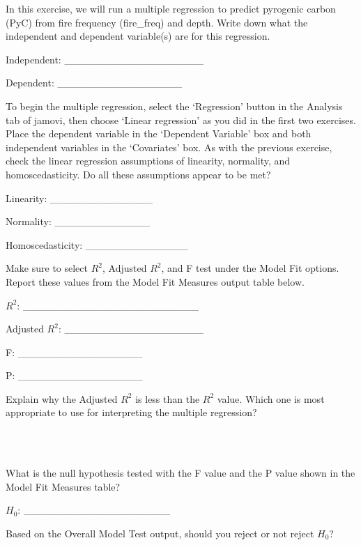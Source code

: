 \documentclass[
  openany]{scrbook}
\begin{document}
In this exercise, we will run a multiple regression to predict pyrogenic carbon (PyC) from fire frequency (fire\_freq) and depth.
Write down what the independent and dependent variable(s) are for this regression.

Independent: \_\_\_\_\_\_\_\_\_\_\_\_\_\_\_\_\_\_\_

Dependent: \_\_\_\_\_\_\_\_\_\_\_\_\_\_\_\_\_

To begin the multiple regression, select the `Regression' button in the Analysis tab of jamovi, then choose `Linear regression' as you did in the first two exercises.
Place the dependent variable in the `Dependent Variable' box and both independent variables in the `Covariates' box.
As with the previous exercise, check the linear regression assumptions of linearity, normality, and homoscedasticity.
Do all these assumptions appear to be met?

Linearity: \_\_\_\_\_\_\_\_\_\_\_\_\_\_

Normality: \_\_\_\_\_\_\_\_\_\_\_\_\_

Homoscedasticity: \_\_\_\_\_\_\_\_\_\_\_\_\_\_

Make sure to select \(R^{2}\), Adjusted \(R^{2}\), and F test under the Model Fit options.
Report these values from the Model Fit Measures output table below.

\(R^{2}\): \_\_\_\_\_\_\_\_\_\_\_\_\_\_\_\_\_\_\_\_\_\_\_\_

Adjusted \(R^{2}\): \_\_\_\_\_\_\_\_\_\_\_\_\_\_\_\_\_\_\_

F: \_\_\_\_\_\_\_\_\_\_\_\_\_\_\_\_\_

P: \_\_\_\_\_\_\_\_\_\_\_\_\_\_\_\_\_

Explain why the Adjusted \(R^{2}\) is less than the \(R^{2}\) value.
Which one is most appropriate to use for interpreting the multiple regression?

\begin{verbatim}



\end{verbatim}

What is the null hypothesis tested with the F value and the P value shown in the Model Fit Measures table?

\(H_{0}\): \_\_\_\_\_\_\_\_\_\_\_\_\_\_\_\_\_\_\_\_

Based on the Overall Model Test output, should you reject or not reject \(H_{0}\)?

\begin{verbatim}
\end{verbatim}
\end{document}
